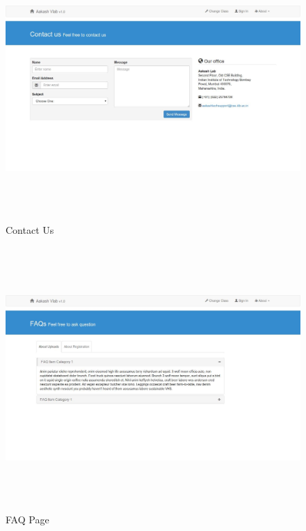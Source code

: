 \documentclass[12pt]{report}
\begin{document}
\begin{figure}[H]
 \centering 
 \includegraphics[width=15cm, height=10cm]{./317.jpg}
 \caption{Contact Us\label{fig:317}}
\end{figure}
\begin{figure}[H]
 \centering 
 \includegraphics[width=15cm, height=10cm]{./318.jpg}
 \caption{FAQ Page \label{fig:318}}
\end{figure}
\end{document}
